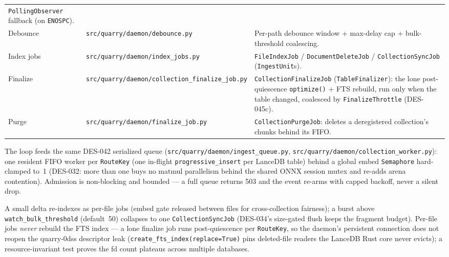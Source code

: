 \documentclass[a4paper,10pt]{article}
\newcommand{\modpath}[1]{\texttt{src/quarry/#1}}
\begin{document}
\begin{center}
\begin{tabular}{llp{6.6cm}}
              \texttt{PollingObserver} fallback (on \texttt{ENOSPC}). \\
Debounce    & \modpath{daemon/debounce.py}      & Per-path debounce window +
              max-delay cap + bulk-threshold coalescing. \\
Index jobs  & \modpath{daemon/index\_jobs.py}   & \texttt{FileIndexJob} /
              \texttt{DocumentDeleteJob} / \texttt{CollectionSyncJob}
              (\texttt{IngestUnit}s). \\
Finalize    & \modpath{daemon/collection\_finalize\_job.py} & \texttt{CollectionFinalizeJob}
              (\texttt{TableFinalizer}): the lone post-quiescence
              \texttt{optimize()} + FTS rebuild, run only when the table
              changed, coalesced by \texttt{FinalizeThrottle} (DES-045c). \\
Purge       & \modpath{daemon/finalize\_job.py} & \texttt{CollectionPurgeJob}:
              deletes a deregistered collection's chunks behind its FIFO. \\
\bottomrule
\end{tabular}
\end{center}

The loop feeds the same DES-042 serialized queue (\modpath{daemon/ingest\_queue.py},
\modpath{daemon/collection\_worker.py}): one resident FIFO worker per
\texttt{RouteKey} (one in-flight \texttt{progressive\_insert} per LanceDB
table) behind a global embed \texttt{Semaphore} hard-clamped to~1 (DES-032:
more than one buys no matmul parallelism behind the shared ONNX session mutex
and re-adds arena contention).  Admission is non-blocking and bounded --- a
full queue returns 503 and the event re-arms with capped backoff, never a
silent drop.

A small delta re-indexes as per-file jobs (embed gate released between files
for cross-collection fairness); a burst above \texttt{watch\_bulk\_threshold}
(default~50) collapses to one \texttt{CollectionSyncJob} (DES-034's size-gated
flush keeps the fragment budget).  Per-file jobs \emph{never} rebuild the FTS
index --- a lone finalize job runs post-quiescence per \texttt{RouteKey}, so
the daemon's persistent connection does not reopen the quarry-0dss descriptor
leak (\texttt{create\_fts\_index(replace=True)} pins deleted-file readers the
LanceDB Rust core never evicts); a resource-invariant test proves the fd count
plateaus across multiple databases.
\end{document}
